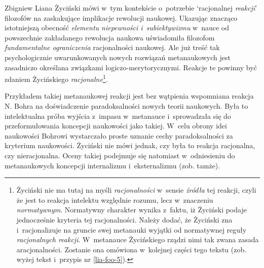 \begin{artplenv}{Zbigniew Liana}
Życiński mówi w~tym kontekście o~potrzebie `racjonalnej \textit{reakcji}' filozofów
\parencites[s.~143]{zycinski_structure_1988}[s.~254; podkreślenie moje]{zycinski_struktura_2013}
na zaskakujące implikacje rewolucji naukowej. Ukazując znacząco
istotniejszą obecność \textit{elementu niepewności i~subiektywizmu} w~nauce od powszechnie zakładanego rewolucja naukowa
uświadomiła filozofom \textit{fundamentalne ograniczenia} racjonalności naukowej. Ale już treść tak psychologicznie
uwarunkowanych nowych rozwiązań metanaukowych jest zasadniczo określana związkami logiczo-merytorycznymi. Reakcje te
powinny być zdaniem Życińskiego \textit{racjonalne}\footnote{Życiński nie ma tutaj na myśli \textit{racjonalności} w~sensie
\textit{źródła} tej reakcji, czyli że jest to reakcja intelektu względnie rozumu, lecz w~znaczeniu \textit{normatywnym}.
Normatywny charakter wynika z~faktu, iż Życiński podaje jednocześnie kryteria tej racjonalności. Należy dodać, że
Życiński zna i~racjonalizuje na gruncie swej metanauki wyjątki od normatywnej reguły \textit{racjonalnych reakcji}. W~metanauce
Życińskiego rządzi nimi tak zwana zasada aracjonalności. Zostanie ona omówiona w~kolejnej części tego tekstu
(zob. wyżej tekst i~przypis nr \ref{lia-foo-5}).}.

Przykładem takiej metanaukowej reakcji jest bez wątpienia wspomniana reakcja N. Bohra na doświadczenie paradoksalności
nowych teorii naukowych. Była to intelektualna próba wyjścia z~impasu w~metanauce i~sprowadzała się do przeformułowania
koncepcji naukowości jako takiej. W~celu obrony idei naukowości Bohrowi wystarczało proste uznanie cechy
paradoksalności za kryterium naukowości. Życiński nie mówi jednak, czy była to reakcja racjonalna, czy nieracjonalna.
Oceny takiej podejmuje się natomiast w~odniesieniu do metanaukowych koncepcji internalizmu i~eksternalizmu (zob.
tamże).


\end{artplenv}

